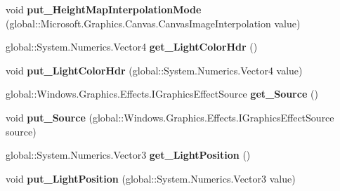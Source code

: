 \begin{DoxyCompactItemize}
void {\bfseries put\+\_\+\+Height\+Map\+Interpolation\+Mode} (global\+::\+Microsoft.\+Graphics.\+Canvas.\+Canvas\+Image\+Interpolation value)
\item 
\mbox{\label{interface_microsoft_1_1_graphics_1_1_canvas_1_1_effects_1_1_i_spot_diffuse_effect_a556eeea9c910c49f196891373d9e397a}} 
global\+::\+System.\+Numerics.\+Vector4 {\bfseries get\+\_\+\+Light\+Color\+Hdr} ()
\item 
\mbox{\label{interface_microsoft_1_1_graphics_1_1_canvas_1_1_effects_1_1_i_spot_diffuse_effect_aa1e8f2a48d0d63deaa4570d23b15820f}} 
void {\bfseries put\+\_\+\+Light\+Color\+Hdr} (global\+::\+System.\+Numerics.\+Vector4 value)
\item 
\mbox{\label{interface_microsoft_1_1_graphics_1_1_canvas_1_1_effects_1_1_i_spot_diffuse_effect_a453acb87a56d1bb79017416dbfc38237}} 
global\+::\+Windows.\+Graphics.\+Effects.\+I\+Graphics\+Effect\+Source {\bfseries get\+\_\+\+Source} ()
\item 
\mbox{\label{interface_microsoft_1_1_graphics_1_1_canvas_1_1_effects_1_1_i_spot_diffuse_effect_ab5678434231c06a79045ee6a8d98101c}} 
void {\bfseries put\+\_\+\+Source} (global\+::\+Windows.\+Graphics.\+Effects.\+I\+Graphics\+Effect\+Source source)
\item 
\mbox{\label{interface_microsoft_1_1_graphics_1_1_canvas_1_1_effects_1_1_i_spot_diffuse_effect_ad9b8b478951619a2bfcbb383bbf47f93}} 
global\+::\+System.\+Numerics.\+Vector3 {\bfseries get\+\_\+\+Light\+Position} ()
\item 
\mbox{\label{interface_microsoft_1_1_graphics_1_1_canvas_1_1_effects_1_1_i_spot_diffuse_effect_a7e2e5d8df7fa4534b35d6c9340ae7d45}} 
void {\bfseries put\+\_\+\+Light\+Position} (global\+::\+System.\+Numerics.\+Vector3 value)
\item 

\end{DoxyCompactItemize}

